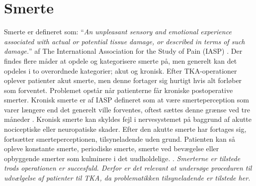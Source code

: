 \section{Smerte}
Smerte er defineret som: “\textit{An unpleasant sensory and emotional experience associated with actual or potential tissue damage, or described in terms of such damage.}” af The International Association for the Study of Pain (IASP) \citep{Giangregorio1997} \citep{Carmon}.
Der findes flere måder at opdele og kategorisere smerte på, men generelt kan det opdeles i to overordnede kategorier; akut og kronisk. Efter TKA-operationer oplever patienter akut smerte, men denne fortager sig hurtigt hvis alt forløber som forventet. Problemet opstår når patienterne får kroniske postoperative smerter. Kronisk smerte er af IASP defineret som at være smerteperception som varer længere end det generelt ville forventes, oftest sættes denne grænse ved tre måneder \citep{Carmon}. Kronisk smerte kan skyldes fejl i nervesystemet på baggrund af akutte nociceptiske eller neuropatiske skader. Efter den akutte smerte har fortages sig, fortsætter smerteperceptionen, tilsyneladende uden grund. Patienten kan så opleve konstante smerte, periodiske smerte, smerte ved bevægelse eller opbyggende smerter som kulminere i det uudholdelige. \citep{Giangregorio1997}. \textit{Smerterne er tilstede trods operationen er succesfuld. Derfor er det relevant at undersøge proceduren til udvælgelse af patienter til TKA, da problematikken tilsyneladende er tilstede her.}

